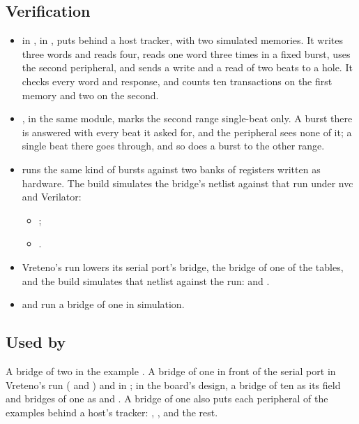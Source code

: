 \subsection*{Verification}

\begin{itemize}
\item {} in
, in , puts
 behind
a host tracker, with two simulated memories. It writes three words and
reads four, reads one word three times in a fixed burst, uses the
second peripheral, and sends a write and a read of two beats to a hole.
It checks every word and response, and counts ten transactions on the
first memory and two on the second.
\item {}, in the
same module, marks the second range single-beat only. A burst there is
answered  with every beat it asked for, and the
peripheral sees none of it; a single beat there goes through, and so
does a burst to the other range.
\item {} runs the same kind of bursts against two
banks of registers written as hardware. The build simulates the
bridge's netlist against that run under nvc and Verilator:
\begin{itemize}
\item {};
\item {}.
\end{itemize}
\item Vreteno's run lowers its serial port's bridge, the
bridge of one of the tables, and the build simulates that netlist
against the run: 
and .
\item {} and  run
a bridge of one in simulation.
\end{itemize}

\subsection*{Used by}

A bridge of two in the example . A bridge of one
in front of the serial port in Vreteno's run
( and ) and
in ; in the board's design, a bridge of ten as its
field  and bridges of one as  and .
A bridge of one also puts each peripheral of the examples behind a
host's tracker: , ,  and the
rest.

